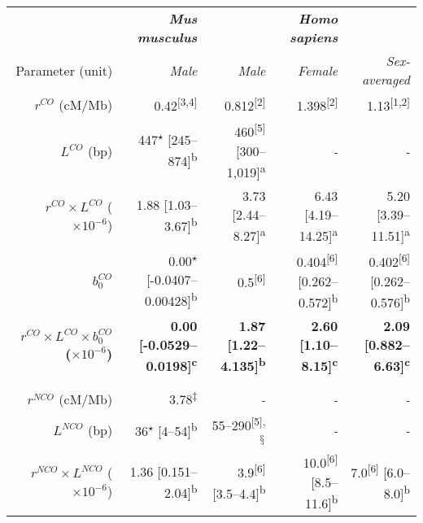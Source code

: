 \begin{sidewaystable}[p]
	\centering
	\begin{adjustbox}{width=\textwidth}
	\begin{tabular}{rrrrr}

		\toprule
		& \textbf{\textit{Mus musculus}} &  & \textbf{\textit{Homo sapiens}} &  \\
		\cmidrule(l){2-2} \cmidrule(l){3-5}
		Parameter (unit) & \textit{Male} & \textit{Male} & \textit{Female} & \textit{Sex-averaged} \\

		\cmidrule(l){1-1} \cmidrule(l){2-2} \cmidrule(l){3-5}

		$r^{CO}$ (cM/Mb)    & 0.42\textsuperscript{[3,4]} & 0.812\textsuperscript{[2]} & 1.398\textsuperscript{[2]} & 1.13\textsuperscript{[1,2]} \\
		$L^{CO}$ (bp)       & 447\textsuperscript{$\star$} [245--874]\textsuperscript{b} & 460\textsuperscript{[5]} [300--1,019]\textsuperscript{a} & \textit{-} & \textit{-} \\
		$r^{CO} \times L^{CO}$ ($\times 10^{-6}$)      & 1.88 [1.03--3.67]\textsuperscript{b} & 3.73 [2.44--8.27]\textsuperscript{a} & 6.43 [4.19--14.25]\textsuperscript{a} & 5.20 [3.39--11.51]\textsuperscript{a} \\
		$b_0^{CO}$          & 0.00\textsuperscript{$\star$} [-0.0407--0.00428]\textsuperscript{b} & 0.5\textsuperscript{[6]} & 0.404\textsuperscript{[6]} [0.262--0.572]\textsuperscript{b} & 0.402\textsuperscript{[6]} [0.262--0.576]\textsuperscript{b}  \\
		\textbf{$r^{CO} \times L^{CO} \times b_0^{CO}$ ($\times 10^{-6}$)}      & \textbf{0.00 [-0.0529--0.0198]\textsuperscript{c}} & \textbf{1.87 [1.22--4.135]\textsuperscript{b}} & \textbf{2.60 [1.10--8.15]\textsuperscript{c}} & \textbf{2.09 [0.882--6.63]\textsuperscript{c}} \\
		\\
		\midrule
		\\
		$r^{NCO}$ (cM/Mb)   & 3.78\textsuperscript{$\ddagger$} & \textit{-} & \textit{-} & \textit{-} \\
		$L^{NCO}$ (bp)      & 36\textsuperscript{$\star$} [4--54]\textsuperscript{b} & 55--290\textsuperscript{[5],$\mathsection$} & \textit{-} & \textit{-} \\
		$r^{NCO} \times L^{NCO}$ ($\times 10^{-6}$)    & 1.36 [0.151--2.04]\textsuperscript{b} & 3.9\textsuperscript{[6]} [3.5--4.4]\textsuperscript{b} & 10.0\textsuperscript{[6]} [8.5--11.6]\textsuperscript{b} & 7.0\textsuperscript{[6]} [6.0--8.0]\textsuperscript{b} \\

\end{tabular}
\end{adjustbox}
\end{sidewaystable}
